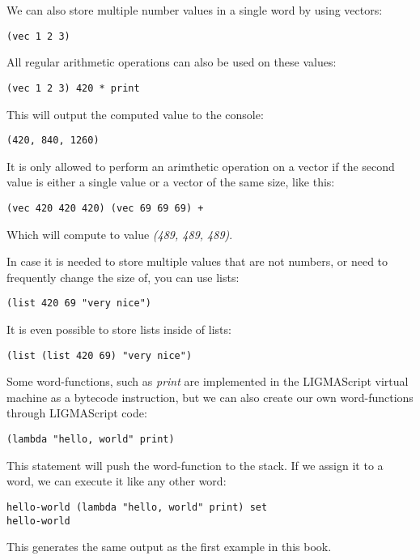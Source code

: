 \documentclass[12pt]{article}
\begin{document}
We can also store multiple number values in a single word by using vectors:
\begin{verbatim}(vec 1 2 3)\end{verbatim}
All regular arithmetic operations can also be used on these values:
\begin{verbatim}(vec 1 2 3) 420 * print\end{verbatim}
This will output the computed value to the console:
\begin{verbatim}(420, 840, 1260)\end{verbatim}
It is only allowed to perform an arimthetic operation on a vector if the second value is either a single value or a vector of the 
same size, like this:
\begin{verbatim}(vec 420 420 420) (vec 69 69 69) +\end{verbatim}
Which will compute to value \emph{(489, 489, 489)}.

In case it is needed to store multiple values that are not numbers, or need to frequently change the size 
of, you can use lists:
\begin{verbatim}(list 420 69 "very nice")\end{verbatim}
It is even possible to store lists inside of lists:
\begin{verbatim}(list (list 420 69) "very nice")\end{verbatim}

Some word-functions, such as \emph{print} are implemented in the LIGMAScript virtual machine as a bytecode instruction, but we can also 
create our own word-functions through LIGMAScript code:
\begin{verbatim}(lambda "hello, world" print)\end{verbatim}

This statement will push the word-function to the stack. If we assign it to a word, we can execute it like 
any other word:
\begin{verbatim}hello-world (lambda "hello, world" print) set
hello-world\end{verbatim}
This generates the same output as the first example in this book.
\end{document}
